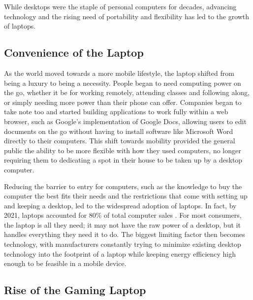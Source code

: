 While desktops were the staple of personal computers for decades, advancing technology and the rising need of portability and flexibility has led to the growth of laptops.


\subsection{Convenience of the Laptop}\label{subsec:ConvenienceOfTheLaptop}

As the world moved towards a more mobile lifestyle, the laptop shifted from being a luxury to being a necessity.
People began to need computing power on the go, whether it be for working remotely, attending classes and following along, or simply needing more power than their phone can offer.
Companies began to take note too and started building applications to work fully within a web browser, such as Google's implementation of Google Docs, allowing users to edit documents on the go without having to install software like Microsoft Word directly to their computers.
This shift towards mobility provided the general public the ability to be more flexible with how they used computers, no longer requiring them to dedicating a spot in their house to be taken up by a desktop computer.

Reducing the barrier to entry for computers, such as the knowledge to buy the computer the best fits their needs and the restrictions that come with setting up and keeping a desktop, led to the widespread adoption of laptops.
In fact, by 2021, laptops accounted for 80\% of total computer sales \cite{idc_2021}.
For most consumers, the laptop is all they need; it may not have the raw power of a desktop, but it handles everything they need it to do.
The biggest limiting factor then becomes technology, with manufacturers constantly trying to minimize existing desktop technology into the footprint of a laptop while keeping energy efficiency high enough to be feasible in a mobile device.


\subsection{Rise of the Gaming Laptop}\label{subsec:RiseOfTheGamingLaptop}

